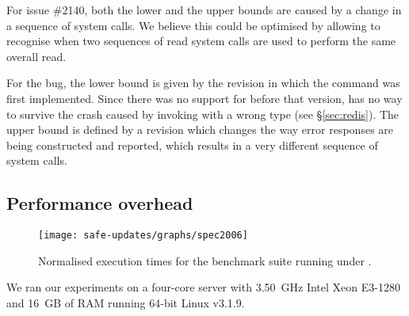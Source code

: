 For \lighttpd issue \#2140, both the lower and the upper bounds are
caused by a change in a sequence of  system calls.  We
believe this could be optimised by allowing \mx to recognise when two
sequences of read system calls are used to perform the same overall
read.


For the \redis bug, the lower bound is given by the revision in which the
 command was first implemented.  Since there was no support for
 before that version, \mx has no way to survive the crash caused
by invoking  with a wrong type (see \S\ref{sec:redis}).  The
upper bound is defined by a revision which changes the way error responses are
being constructed and reported, which results in a very different sequence of
system calls.



\subsection{Performance overhead}
\label{sec:performance}

\begin{figure}[!t]
\centering
\texttt{[image: safe-updates/graphs/spec2006]}
\caption{Normalised execution times for the \speczerosix benchmark suite
running under \mx.}
\label{fig:spec}
\end{figure}

We ran our experiments on a four-core server with 3.50~GHz Intel
Xeon E3-1280 and 16~GB of RAM running 64-bit Linux v3.1.9.

